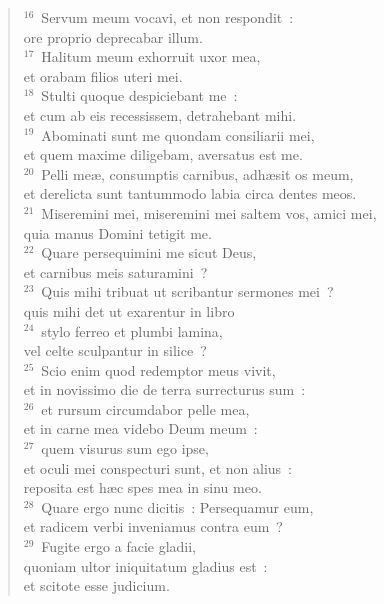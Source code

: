 \begin{flushleft}
\begin{verse}
${}^{16}$~Servum meum vocavi, et non respondit~:\\ ore proprio deprecabar illum.\\
${}^{17}$~Halitum meum exhorruit uxor mea,\\ et orabam filios uteri mei.\\
${}^{18}$~Stulti quoque despiciebant me~:\\ et cum ab eis recessissem, detrahebant mihi.\\
${}^{19}$~Abominati sunt me quondam consiliarii mei,\\ et quem maxime diligebam, aversatus est me.\\
${}^{20}$~Pelli me\ae , consumptis carnibus, adh\ae sit os meum,\\ et derelicta sunt tantummodo labia circa dentes meos.\\
${}^{21}$~Miseremini mei, miseremini mei saltem vos, amici mei,\\ quia manus Domini tetigit me.\\
${}^{22}$~Quare persequimini me sicut Deus,\\ et carnibus meis saturamini~?\\
${}^{23}$~Quis mihi tribuat ut scribantur sermones mei~?\\ quis mihi det ut exarentur in libro\\
${}^{24}$~stylo ferreo et plumbi lamina,\\ vel celte sculpantur in silice~?\\
${}^{25}$~Scio enim quod redemptor meus vivit,\\ et in novissimo die de terra surrecturus sum~:\\
${}^{26}$~et rursum circumdabor pelle mea,\\ et in carne mea videbo Deum meum~:\\
${}^{27}$~quem visurus sum ego ipse,\\ et oculi mei conspecturi sunt, et non alius~:\\ reposita est h\ae c spes mea in sinu meo.\\
${}^{28}$~Quare ergo nunc dicitis~: Persequamur eum,\\ et radicem verbi inveniamus contra eum~?\\
${}^{29}$~Fugite ergo a facie gladii,\\ quoniam ultor iniquitatum gladius est~:\\ et scitote esse judicium.\end{verse}\end{flushleft}




